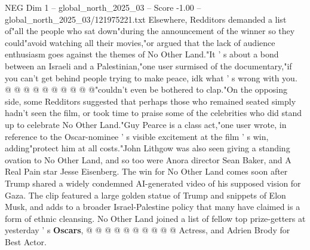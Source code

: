 \begin{textsample}{NEG Dim 1 – global\_north\_2025\_03 – Score -1.00 – global\_north\_2025\_03/121975221.txt}
Elsewhere, Redditors demanded a list of"all the people who sat down"during the announcement of the winner so they could"avoid watching all their movies,"or argued that the lack of audience enthusiasm goes against the themes of No Other Land."It ' s about a bond between an Israeli and a Palestinian,"one user surmised of the documentary,"if you can't get behind people trying to make peace, idk what ' s wrong with you. @ @ @ @ @ @ @ @ @ @"couldn't even be bothered to clap."On the opposing side, some Redditors suggested that perhaps those who remained seated simply hadn't seen the film, or took time to praise some of the celebrities who did stand up to celebrate No Other Land."Guy Pearce is a class act,"one user wrote, in reference to the Oscar-nominee ' s visible excitement at the film ' s win, adding"protect him at all costs."John Lithgow was also seen giving a standing ovation to No Other Land, and so too were Anora director Sean Baker, and A Real Pain star Jesse Eisenberg.
The win for No Other Land comes soon after Trump shared a widely condemned AI-generated video of his supposed vision for Gaza.
The clip featured a large golden statue of Trump and snippets of Elon Musk, and adds to a broader Israel-Palestine policy that many have claimed is a form of ethnic cleansing.
No Other Land joined a list of fellow top prize-getters at yesterday ' s \textbf{Oscars}, @ @ @ @ @ @ @ @ @ @ Actress, and Adrien Brody for Best Actor.

\end{textsample}
